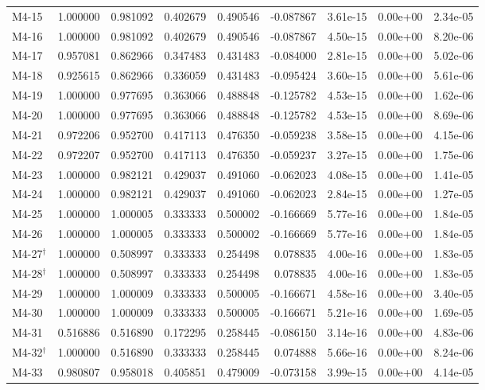 \begin{longtable}{@{}lrrrrrrrr@{}}
M4-15 & 1.000000 & 0.981092 & 0.402679 & 0.490546 & -0.087867 & 3.61e-15 & 0.00e+00 & 2.34e-05\\
M4-16 & 1.000000 & 0.981092 & 0.402679 & 0.490546 & -0.087867 & 4.50e-15 & 0.00e+00 & 8.20e-06\\
M4-17 & 0.957081 & 0.862966 & 0.347483 & 0.431483 & -0.084000 & 2.81e-15 & 0.00e+00 & 5.02e-06\\
M4-18 & 0.925615 & 0.862966 & 0.336059 & 0.431483 & -0.095424 & 3.60e-15 & 0.00e+00 & 5.61e-06\\
M4-19 & 1.000000 & 0.977695 & 0.363066 & 0.488848 & -0.125782 & 4.53e-15 & 0.00e+00 & 1.62e-06\\
M4-20 & 1.000000 & 0.977695 & 0.363066 & 0.488848 & -0.125782 & 4.53e-15 & 0.00e+00 & 8.69e-06\\
M4-21 & 0.972206 & 0.952700 & 0.417113 & 0.476350 & -0.059238 & 3.58e-15 & 0.00e+00 & 4.15e-06\\
M4-22 & 0.972207 & 0.952700 & 0.417113 & 0.476350 & -0.059237 & 3.27e-15 & 0.00e+00 & 1.75e-06\\
M4-23 & 1.000000 & 0.982121 & 0.429037 & 0.491060 & -0.062023 & 4.08e-15 & 0.00e+00 & 1.41e-05\\
M4-24 & 1.000000 & 0.982121 & 0.429037 & 0.491060 & -0.062023 & 2.84e-15 & 0.00e+00 & 1.27e-05\\
M4-25 & 1.000000 & 1.000005 & 0.333333 & 0.500002 & -0.166669 & 5.77e-16 & 0.00e+00 & 1.84e-05\\
M4-26 & 1.000000 & 1.000005 & 0.333333 & 0.500002 & -0.166669 & 5.77e-16 & 0.00e+00 & 1.84e-05\\
M4-27$^\dagger$ & 1.000000 & 0.508997 & 0.333333 & 0.254498 & 0.078835 & 4.00e-16 & 0.00e+00 & 1.83e-05\\
M4-28$^\dagger$ & 1.000000 & 0.508997 & 0.333333 & 0.254498 & 0.078835 & 4.00e-16 & 0.00e+00 & 1.83e-05\\
M4-29 & 1.000000 & 1.000009 & 0.333333 & 0.500005 & -0.166671 & 4.58e-16 & 0.00e+00 & 3.40e-05\\
M4-30 & 1.000000 & 1.000009 & 0.333333 & 0.500005 & -0.166671 & 5.21e-16 & 0.00e+00 & 1.69e-05\\
M4-31 & 0.516886 & 0.516890 & 0.172295 & 0.258445 & -0.086150 & 3.14e-16 & 0.00e+00 & 4.83e-06\\
M4-32$^\dagger$ & 1.000000 & 0.516890 & 0.333333 & 0.258445 & 0.074888 & 5.66e-16 & 0.00e+00 & 8.24e-06\\
M4-33 & 0.980807 & 0.958018 & 0.405851 & 0.479009 & -0.073158 & 3.99e-15 & 0.00e+00 & 4.14e-05\\

\end{longtable}
